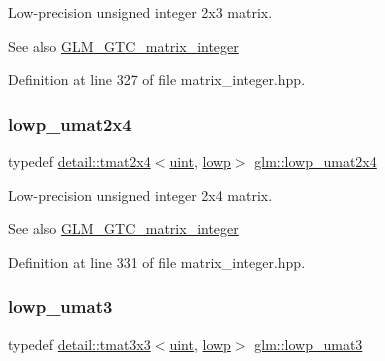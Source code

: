 Low-\/precision unsigned integer 2x3 matrix. \begin{DoxySeeAlso}{See also}
\hyperlink{group__gtc__matrix__integer}{G\+L\+M\+\_\+\+G\+T\+C\+\_\+matrix\+\_\+integer} 
\end{DoxySeeAlso}


Definition at line 327 of file matrix\+\_\+integer.\+hpp.

\mbox{\label{group__gtc__matrix__integer_ga581eef861234e918e88377fd331e37e6}} 
\subsubsection{\texorpdfstring{lowp\+\_\+umat2x4}{lowp\_umat2x4}}
{\footnotesize\ttfamily typedef \hyperlink{structglm_1_1detail_1_1tmat2x4}{detail\+::tmat2x4}$<$\hyperlink{group__core__precision_ga4fd29415871152bfb5abd588334147c8}{uint}, \hyperlink{namespaceglm_a0f04f086094c747d227af4425893f545ae161af3fc695e696ce3bf69f7332bc2d}{lowp}$>$ \hyperlink{group__gtc__matrix__integer_ga581eef861234e918e88377fd331e37e6}{glm\+::lowp\+\_\+umat2x4}}

Low-\/precision unsigned integer 2x4 matrix. \begin{DoxySeeAlso}{See also}
\hyperlink{group__gtc__matrix__integer}{G\+L\+M\+\_\+\+G\+T\+C\+\_\+matrix\+\_\+integer} 
\end{DoxySeeAlso}


Definition at line 331 of file matrix\+\_\+integer.\+hpp.

\mbox{\label{group__gtc__matrix__integer_ga7160c0ac500826224d3baf1003c0432c}} 
\subsubsection{\texorpdfstring{lowp\+\_\+umat3}{lowp\_umat3}}
{\footnotesize\ttfamily typedef \hyperlink{structglm_1_1detail_1_1tmat3x3}{detail\+::tmat3x3}$<$\hyperlink{group__core__precision_ga4fd29415871152bfb5abd588334147c8}{uint}, \hyperlink{namespaceglm_a0f04f086094c747d227af4425893f545ae161af3fc695e696ce3bf69f7332bc2d}{lowp}$>$ \hyperlink{group__gtc__matrix__integer_ga7160c0ac500826224d3baf1003c0432c}{glm\+::lowp\+\_\+umat3}}

